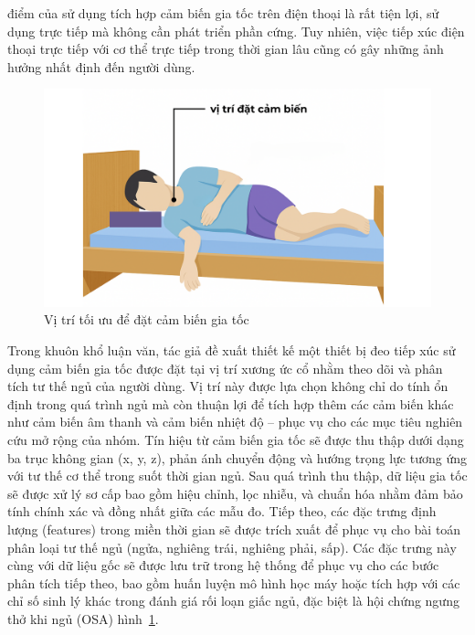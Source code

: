 điểm của sử dụng tích hợp cảm biến gia tốc trên điện thoại là rất tiện lợi, sử dụng trực tiếp mà không cần phát triển phần cứng. Tuy nhiên, việc tiếp xúc điện thoại trực tiếp với cơ thể trực tiếp trong thời gian lâu cũng có gây những ảnh hưởng nhất định đến người dùng.

\begin{figure}[!ht]
		\centering
 		\includegraphics[width=\textwidth]{images/vị trí đặt cảm biến.png}
 		\vspace*{-7mm}
		\caption{Vị trí tối ưu để đặt cảm biến gia tốc}
		\label{position_sensor}
\end{figure}

Trong khuôn khổ luận văn, tác giả đề xuất thiết kế một thiết bị đeo tiếp xúc sử dụng cảm biến gia tốc được đặt tại vị trí xương ức cổ nhằm theo dõi và phân tích tư thế ngủ của người dùng. Vị trí này được lựa chọn không chỉ do tính ổn định trong quá trình ngủ mà còn thuận lợi để tích hợp thêm các cảm biến khác như cảm biến âm thanh và cảm biến nhiệt độ – phục vụ cho các mục tiêu nghiên cứu mở rộng của nhóm. Tín hiệu từ cảm biến gia tốc sẽ được thu thập dưới dạng ba trục không gian (x, y, z), phản ánh chuyển động và hướng trọng lực tương ứng với tư thế cơ thể trong suốt thời gian ngủ. Sau quá trình thu thập, dữ liệu gia tốc sẽ được xử lý sơ cấp bao gồm hiệu chỉnh, lọc nhiễu, và chuẩn hóa nhằm đảm bảo tính chính xác và đồng nhất giữa các mẫu đo. Tiếp theo, các đặc trưng định lượng (features) trong miền thời gian sẽ được trích xuất để phục vụ cho bài toán phân loại tư thế ngủ (ngửa, nghiêng trái, nghiêng phải, sấp). Các đặc trưng này cùng với dữ liệu gốc sẽ được lưu trữ trong hệ thống để phục vụ cho các bước phân tích tiếp theo, bao gồm huấn luyện mô hình học máy hoặc tích hợp với các chỉ số sinh lý khác trong đánh giá rối loạn giấc ngủ, đặc biệt là hội chứng ngưng thở khi ngủ (OSA) hình~\ref{position_sensor}.

